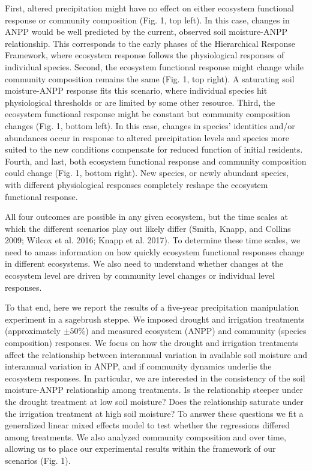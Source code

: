 \documentclass[fleqn,10pt,lineno]{wlpeerj} %
\begin{document}
First, altered precipitation might have no effect on either ecosystem
functional response or community composition (Fig. 1, top left). In this
case, changes in ANPP would be well predicted by the current, observed
soil moisture-ANPP relationship. This corresponds to the early phases of
the Hierarchical Response Framework, where ecosystem response follows
the physiological responses of individual species. Second, the ecosystem
functional response might change while community composition remains the
same (Fig. 1, top right). A saturating soil moisture-ANPP response fits
this scenario, where individual species hit physiological thresholds or
are limited by some other resource. Third, the ecosystem functional
response might be constant but community composition changes (Fig. 1,
bottom left). In this case, changes in species' identities and/or
abundances occur in response to altered precipitation levels and species
more suited to the new conditions compensate for reduced function of
initial residents. Fourth, and last, both ecosystem functional response
and community composition could change (Fig. 1, bottom right). New
species, or newly abundant species, with different physiological
responses completely reshape the ecosystem functional response.

All four outcomes are possible in any given ecosystem, but the time
scales at which the different scenarios play out likely differ (Smith,
Knapp, and Collins 2009; Wilcox et al. 2016; Knapp et al. 2017). To
determine these time scales, we need to amass information on how quickly
ecosystem functional responses change in different ecosystems. We also
need to understand whether changes at the ecosystem level are driven by
community level changes or individual level responses.

To that end, here we report the results of a five-year precipitation
manipulation experiment in a sagebrush steppe. We imposed drought and
irrigation treatments (approximately \(\pm50\%\)) and measured ecosystem
(ANPP) and community (species composition) responses. We focus on how
the drought and irrigation treatments affect the relationship between
interannual variation in available soil moisture and interannual
variation in ANPP, and if community dynamics underlie the ecosystem
responses. In particular, we are interested in the consistency of the
soil moisture-ANPP relationship among treatments. Is the relationship
steeper under the drought treatment at low soil moisture? Does the
relationship saturate under the irrigation treatment at high soil
moisture? To answer these questions we fit a generalized linear mixed
effects model to test whether the regressions differed among treatments.
We also analyzed community composition and
 over
time, allowing us to place our experimental results within the framework
of our scenarios (Fig. 1).
\end{document}
